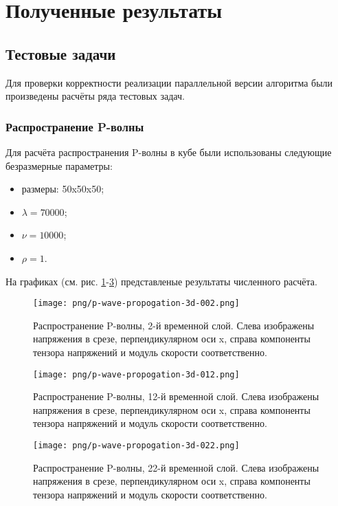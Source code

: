 \section{Полученные результаты}
\subsection{Тестовые задачи}
Для проверки корректности реализации параллельной версии алгоритма были
произведены расчёты ряда тестовых задач.
\subsubsection{Распространение P-волны}
Для расчёта распространения P-волны в кубе были использованы следующие
безразмерные параметры: 
\begin{itemize}
\item размеры: 50x50x50;
\item $\lambda=70000$;
\item $\nu=10000$;
\item $\rho=1$.
\end{itemize}
На графиках (см. рис.
\ref{pic:p_wave_2}-\ref{pic:p_wave_22}) представленые результаты численного расчёта.
\begin{figure}[htp]
\centering
\texttt{[image: png/p-wave-propogation-3d-002.png]}
\caption{Распространение P-волны, 2-й временной слой. Слева изображены
напряжения в срезе, перпендикулярном оси x, справа компоненты тензора напряжений
и модуль скорости соответственно.}
\label{pic:p_wave_2}
\end{figure}
\begin{figure}[htp]
\centering
\texttt{[image: png/p-wave-propogation-3d-012.png]}
\caption{Распространение P-волны, 12-й временной слой. Слева изображены
напряжения в срезе, перпендикулярном оси x, справа компоненты тензора напряжений
и модуль скорости соответственно.}
\label{pic:p_wave_12}
\end{figure}
\begin{figure}[htp]
\centering
\texttt{[image: png/p-wave-propogation-3d-022.png]}
\caption{Распространение P-волны, 22-й временной слой. Слева изображены
напряжения в срезе, перпендикулярном оси x, справа компоненты тензора напряжений
и модуль скорости соответственно.}
\label{pic:p_wave_22}
\end{figure}
